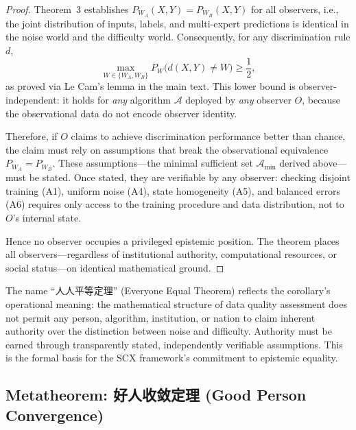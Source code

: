\begin{proof}
Theorem~3 establishes $P_{W_A}(X,Y) = P_{W_B}(X,Y)$ for all observers,
i.e., the joint distribution of inputs, labels, and multi-expert predictions
is identical in the noise world and the difficulty world. Consequently, for
any discrimination rule $d$,
\[
\max_{W\in\{W_A,W_B\}} P_W\bigl(d(X,Y) \neq W\bigr) \geq \frac{1}{2},
\]
as proved via Le Cam's lemma in the main text. This lower bound is
observer-independent: it holds for \emph{any} algorithm $\mathcal{A}$
deployed by \emph{any} observer $O$, because the observational data do not
encode observer identity.

Therefore, if $O$ claims to achieve discrimination performance better than
chance, the claim must rely on assumptions that break the observational
equivalence $P_{W_A} = P_{W_B}$. These assumptions---the minimal sufficient
set $\mathcal{A}_{\min}$ derived above---must be stated. Once stated, they
are verifiable by any observer: checking disjoint training (A1), uniform
noise (A4), state homogeneity (A5), and balanced errors (A6) requires only
access to the training procedure and data distribution, not to $O$'s
internal state.

Hence no observer occupies a privileged epistemic position. The theorem
places all observers---regardless of institutional authority, computational
resources, or social status---on identical mathematical ground.
\end{proof}

\begin{remark}
The name ``人人平等定理'' (Everyone Equal Theorem) reflects the
corollary's operational meaning: the mathematical structure of data quality
assessment does not permit any person, algorithm, institution, or nation to
claim inherent authority over the distinction between noise and difficulty.
Authority must be earned through transparently stated, independently
verifiable assumptions. This is the formal basis for the SCX framework's
commitment to epistemic equality.
\end{remark}

\subsection{Metatheorem: 好人收敛定理 (Good Person Convergence)}
\label{sec:good-convergence}

